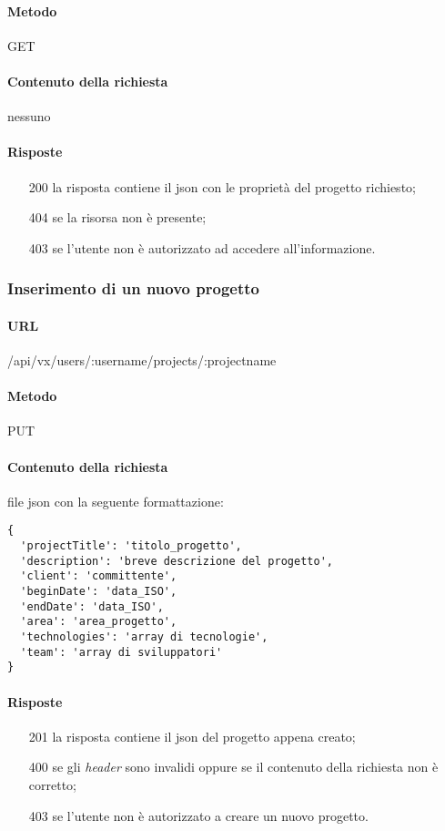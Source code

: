 \paragraph{Metodo}
GET
\paragraph{Contenuto della richiesta}
nessuno
\paragraph{Risposte}
\begin{itemize}
	\item[200] la risposta contiene il \gls{json} con le proprietà del progetto richiesto;
	\item[404] se la risorsa non è presente;
	\item[403] se l'utente non è autorizzato ad accedere all'informazione.
\end{itemize}

\subsubsection{Inserimento di un nuovo progetto}
\paragraph{URL}
/api/vx/users/:username/projects/:projectname
\paragraph{Metodo}
PUT
\paragraph{Contenuto della richiesta}
file \gls{json} con la seguente formattazione:
\begin{verbatim}
{
  'projectTitle': 'titolo_progetto',
  'description': 'breve descrizione del progetto',
  'client': 'committente',
  'beginDate': 'data_ISO',
  'endDate': 'data_ISO',
  'area': 'area_progetto',
  'technologies': 'array di tecnologie',
  'team': 'array di sviluppatori'
}
\end{verbatim}
\paragraph{Risposte}
\begin{itemize}
	\item[201] la risposta contiene il \gls{json} del progetto appena creato;
	\item[400] se gli \emph{header} sono invalidi oppure se il contenuto della richiesta non è corretto;
	\item[403] se l'utente non è autorizzato a creare un nuovo progetto.
\end{itemize}

